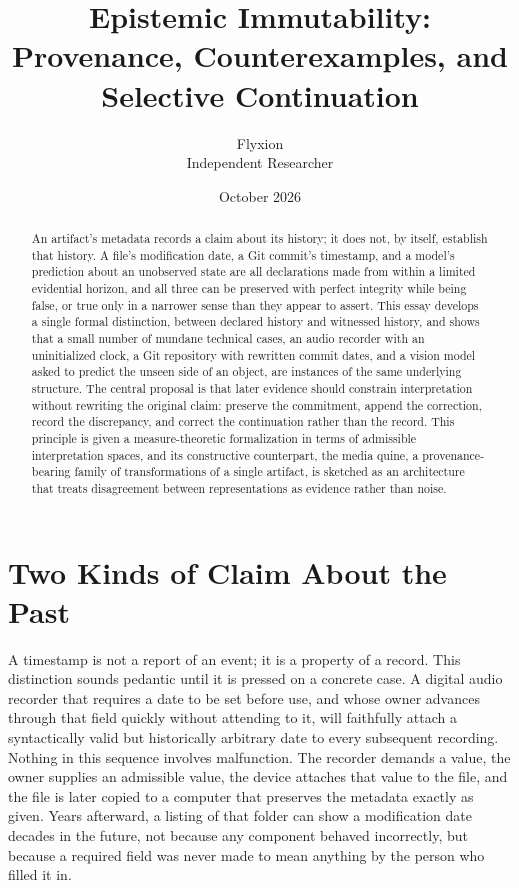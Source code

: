 \documentclass[11pt]{article}
\title{Epistemic Immutability: Provenance, Counterexamples, and Selective Continuation}
\author{Flyxion \\ \small Independent Researcher}
\date{October 2026}
\begin{document}
\maketitle

\begin{abstract}
An artifact's metadata records a claim about its history; it does not, by itself, establish that history. A file's modification date, a Git commit's timestamp, and a model's prediction about an unobserved state are all declarations made from within a limited evidential horizon, and all three can be preserved with perfect integrity while being false, or true only in a narrower sense than they appear to assert. This essay develops a single formal distinction, between declared history and witnessed history, and shows that a small number of mundane technical cases, an audio recorder with an uninitialized clock, a Git repository with rewritten commit dates, and a vision model asked to predict the unseen side of an object, are instances of the same underlying structure. The central proposal is that later evidence should constrain interpretation without rewriting the original claim: preserve the commitment, append the correction, record the discrepancy, and correct the continuation rather than the record. This principle is given a measure-theoretic formalization in terms of admissible interpretation spaces, and its constructive counterpart, the media quine, a provenance-bearing family of transformations of a single artifact, is sketched as an architecture that treats disagreement between representations as evidence rather than noise.
\end{abstract}

\section{Two Kinds of Claim About the Past}

A timestamp is not a report of an event; it is a property of a record. This distinction sounds pedantic until it is pressed on a concrete case. A digital audio recorder that requires a date to be set before use, and whose owner advances through that field quickly without attending to it, will faithfully attach a syntactically valid but historically arbitrary date to every subsequent recording. Nothing in this sequence involves malfunction. The recorder demands a value, the owner supplies an admissible value, the device attaches that value to the file, and the file is later copied to a computer that preserves the metadata exactly as given. Years afterward, a listing of that folder can show a modification date decades in the future, not because any component behaved incorrectly, but because a required field was never made to mean anything by the person who filled it in.
\end{document}
